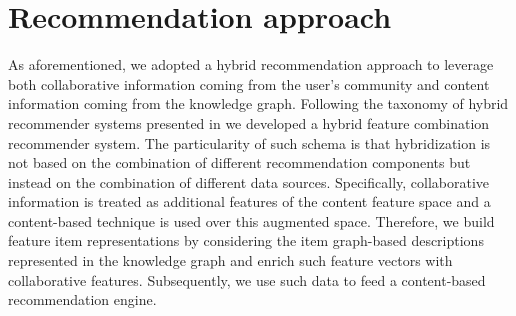 \section{Recommendation approach}
\label{sec:graph-rec:approach}
As aforementioned, we adopted a hybrid recommendation approach to leverage both collaborative information coming from the user's community and content information coming from the knowledge graph. 
Following the taxonomy of hybrid recommender systems presented in \cite{Burke2002} we developed a hybrid feature combination recommender system. 
The particularity of such schema is that hybridization is not based on the combination of different recommendation components but instead on the combination of different data sources. 
Specifically, collaborative information is treated as additional features of the content feature space and a content-based technique is used over this augmented space. Therefore, we build feature item representations by considering the item graph-based descriptions represented in the knowledge graph and enrich such feature vectors with collaborative features. Subsequently, we use such data to feed a content-based recommendation engine. 

